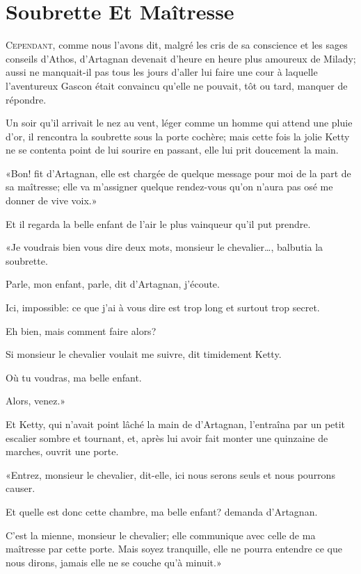 
\chapter{Soubrette Et Maîtresse}

\lettrine{C}{ependant,} comme nous l'avons dit, malgré les cris de sa conscience et les sages conseils d'Athos, d'Artagnan devenait d'heure en heure plus amoureux de Milady; aussi ne manquait-il pas tous les jours d'aller lui faire une cour à laquelle l'aventureux Gascon était convaincu qu'elle ne pouvait, tôt ou tard, manquer de répondre. 

Un soir qu'il arrivait le nez au vent, léger comme un homme qui attend une pluie d'or, il rencontra la soubrette sous la porte cochère; mais cette fois la jolie Ketty ne se contenta point de lui sourire en passant, elle lui prit doucement la main. 

«Bon! fit d'Artagnan, elle est chargée de quelque message pour moi de la part de sa maîtresse; elle va m'assigner quelque rendez-vous qu'on n'aura pas osé me donner de vive voix.» 

Et il regarda la belle enfant de l'air le plus vainqueur qu'il put prendre. 

«Je voudrais bien vous dire deux mots, monsieur le chevalier\dots, balbutia la soubrette. 

\speak  Parle, mon enfant, parle, dit d'Artagnan, j'écoute. 

\speak  Ici, impossible: ce que j'ai à vous dire est trop long et surtout trop secret. 

\speak  Eh bien, mais comment faire alors? 

\speak  Si monsieur le chevalier voulait me suivre, dit timidement Ketty. 

\speak  Où tu voudras, ma belle enfant. 

\speak  Alors, venez.» 

Et Ketty, qui n'avait point lâché la main de d'Artagnan, l'entraîna par un petit escalier sombre et tournant, et, après lui avoir fait monter une quinzaine de marches, ouvrit une porte. 

«Entrez, monsieur le chevalier, dit-elle, ici nous serons seuls et nous pourrons causer. 

\speak  Et quelle est donc cette chambre, ma belle enfant? demanda d'Artagnan. 

\speak  C'est la mienne, monsieur le chevalier; elle communique avec celle de ma maîtresse par cette porte. Mais soyez tranquille, elle ne pourra entendre ce que nous dirons, jamais elle ne se couche qu'à minuit.» 


